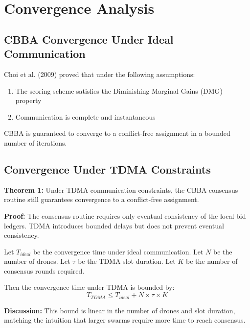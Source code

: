 \section{Convergence Analysis}

\subsection{CBBA Convergence Under Ideal Communication}
Choi et al. (2009) proved that under the following assumptions:
\begin{enumerate}
    \item The scoring scheme satisfies the Diminishing Marginal Gains (DMG) property
    \item Communication is complete and instantaneous
\end{enumerate}
CBBA is guaranteed to converge to a conflict-free assignment in a bounded number of iterations.

\subsection{Convergence Under TDMA Constraints}

\textbf{Theorem 1:} Under TDMA communication constraints, the CBBA consensus routine still guarantees convergence to a conflict-free assignment.

\textbf{Proof:}
The consensus routine requires only eventual consistency of the local bid ledgers. TDMA introduces bounded delays but does not prevent eventual consistency.

Let $T_{ideal}$ be the convergence time under ideal communication.
Let $N$ be the number of drones.
Let $\tau$ be the TDMA slot duration.
Let $K$ be the number of consensus rounds required.

Then the convergence time under TDMA is bounded by:
\[
T_{TDMA} \leq T_{ideal} + N \times \tau \times K
\]

\textbf{Discussion:} This bound is linear in the number of drones and slot duration, matching the intuition that larger swarms require more time to reach consensus.